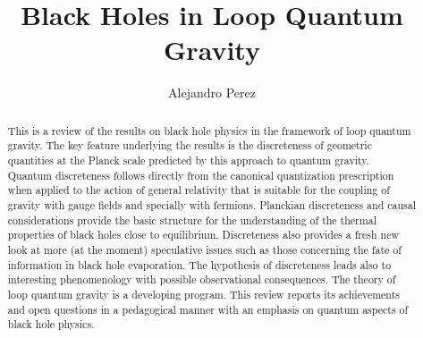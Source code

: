 \documentclass[aps, nofootinbib,superscriptaddress,12pt]{revtex4-2}
\def\be{\begin{equation}}
\def\ee{\end{equation}}
\newcommand{\R}{\mathbb{R}}
\begin{document}
\title{Black Holes in Loop Quantum Gravity}


\author{Alejandro Perez}
\begin{abstract}
This is a review of the results on black hole physics in the framework of
loop quantum gravity. The key feature underlying the results is the discreteness of 
geometric quantities at the Planck scale predicted by this approach to quantum gravity.
Quantum discreteness follows directly from the canonical quantization prescription when applied to the 
action of general relativity that is suitable for the coupling of gravity with gauge 
fields and specially with fermions. Planckian discreteness and causal considerations provide the basic structure 
for the understanding of the thermal properties of black holes close to equilibrium. 
Discreteness also provides a fresh new look at more (at the moment) speculative issues such as those concerning the fate 
of information in black hole evaporation. The hypothesis of discreteness leads also to interesting phenomenology with possible
observational consequences. The theory of loop quantum gravity is a developing  program. This review reports its achievements and open questions in a pedagogical manner with an emphasis on quantum aspects of black hole physics.   
\end{abstract}

\maketitle


%
\end{document}
